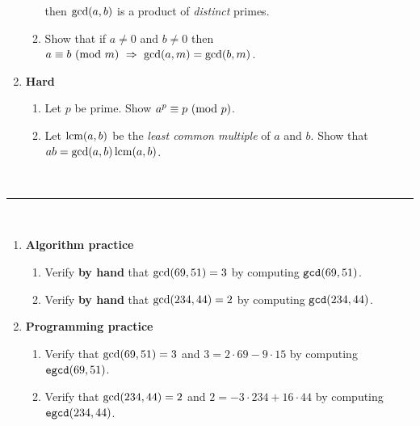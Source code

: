 \begin{enumerate}
\begin{enumerate}
                then $\gcd\pn*{a, b}$ is a product of \emph{distinct} primes.
            \item
                Show that if $a \neq 0$ and $b \neq 0$
                then $\modulo{a}{b}{m} \implies \gcd\pn*{a, m} = \gcd\pn*{b, m}$.
        \end{enumerate}
    \item \textbf{Hard}
        \begin{enumerate}
            \item
                Let $p$ be prime. Show $\modulo{a^p}{p}{p}$.
            \item
                Let $\lcm\pn*{a, b}$ be the \emph{least common multiple} of $a$ and $b$.
                Show that $ab = \gcd\pn*{a, b}\lcm\pn*{a, b}$.
        \end{enumerate}
\end{enumerate}

~\\
\hrule
~\\

\begin{enumerate}
    \item \textbf{Algorithm practice}
        \begin{enumerate}
            \item
                Verify \textbf{by hand} that $\gcd\pn*{69, 51} = 3$
                by computing $\texttt{gcd}\pn*{69, 51}$.
            \item
                Verify \textbf{by hand} that $\gcd\pn*{234, 44} = 2$
                by computing $\texttt{gcd}\pn*{234, 44}$.
        \end{enumerate}
    \item \textbf{Programming practice}
        \begin{enumerate}
            \item
                Verify that $\gcd\pn*{69, 51} = 3$ and $3 = 2 \cdot 69 - 9 \cdot 15$
                by computing $\texttt{egcd}\pn*{69, 51}$.
            \item
                Verify that $\gcd\pn*{234, 44} = 2$ and $2 = -3 \cdot 234 + 16 \cdot 44$
                by computing $\texttt{egcd}\pn*{234, 44}$.
        \end{enumerate}
\end{enumerate}

